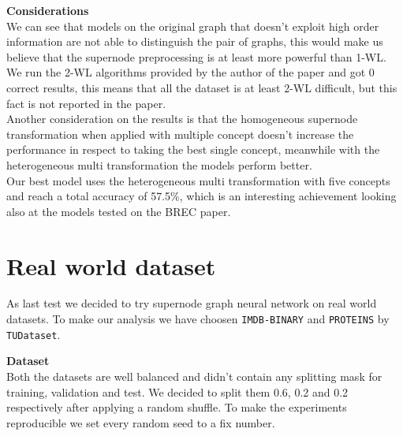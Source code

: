 \documentclass[twoside,11pt]{article}
\begin{document}
\noindent
\textbf{Considerations}\\
We can see that models on the original graph that doesn't exploit high order information are not able to distinguish the pair of graphs, this would make us believe that the supernode preprocessing is at least more powerful than 1-WL. We run the 2-WL algorithms provided by the author of the paper and got 0 correct results, this means that all the dataset is at least 2-WL difficult, but this fact is not reported in the paper.\\
Another consideration on the results is that the homogeneous supernode transformation when applied with multiple concept doesn't increase the performance in respect to taking the best single concept, meanwhile with the heterogeneous multi transformation the models perform better.\\
Our best model uses the heterogeneous multi transformation with five concepts and reach a total accuracy of 57.5\%, which is an interesting achievement looking also at the models tested on the BREC paper.




\section{Real world dataset} %
\label{sec:real_world_dataset}

As last test we decided to try supernode graph neural network on real world datasets.
To make our analysis we have choosen \texttt{IMDB-BINARY} and \texttt{PROTEINS} by \texttt{TUDataset}.

\noindent
\textbf{Dataset}\\
Both the datasets are well balanced and didn't contain any splitting mask for training, validation and test. We decided to split them 0.6, 0.2 and 0.2 respectively after applying a random shuffle. To make the experiments reproducible we set every random seed to a fix number.\\

\noindent
{}\\
\end{document}
